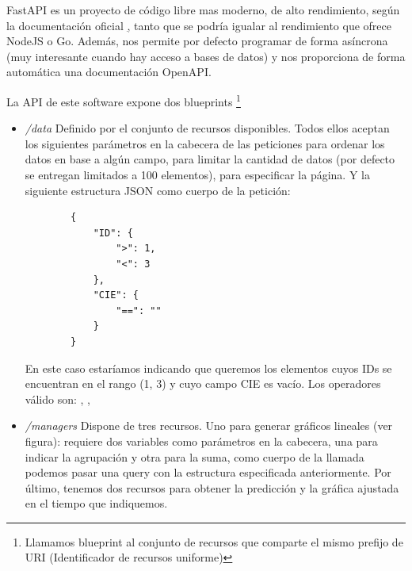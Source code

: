 FastAPI es un proyecto de código libre mas moderno, de alto rendimiento, según la documentación oficial \href{https://fastapi.tiangolo.com}, tanto que se podría igualar al rendimiento que ofrece NodeJS o Go. Además, nos permite por defecto programar de forma asíncrona (muy interesante cuando hay acceso a bases de datos) y nos proporciona de forma automática una documentación OpenAPI.

La API de este software expone dos blueprints \footnote{Llamamos blueprint al conjunto de recursos que comparte el mismo prefijo de URI (Identificador de recursos uniforme)}

\begin{itemize}
    \item \textit{/data} Definido por el conjunto de recursos disponibles. Todos ellos aceptan los siguientes parámetros en la cabecera de las peticiones  para ordenar los datos en base a algún campo,  para limitar la cantidad de datos (por defecto se entregan limitados a 100 elementos),  para especificar la página.
    Y la siguiente estructura JSON como cuerpo de la petición:
    \begin{verbatim}
        {
            "ID": {
                ">": 1,
                "<": 3
            },
            "CIE": {
                "==": ""
            }
        }
    \end{verbatim}
    En este caso estaríamos indicando que queremos los elementos cuyos IDs se encuentran en el rango (1, 3) y cuyo campo CIE es vacío. Los operadores válido son: \codeword{==}, \codeword{<}, \codeword{>}

    \item \textit{/managers} Dispone de tres recursos. Uno para generar gráficos lineales (ver figura): requiere dos variables como parámetros en la cabecera, una para indicar la agrupación y otra para la suma, como cuerpo de la llamada podemos pasar una query con la estructura especificada anteriormente. Por último, tenemos dos recursos para obtener la predicción y la gráfica ajustada en el tiempo que indiquemos.
\end{itemize}

